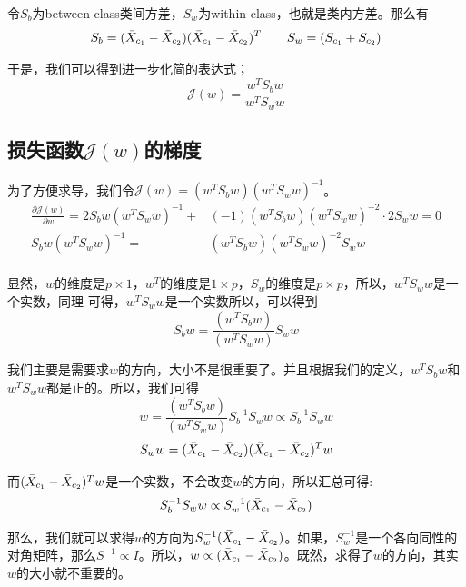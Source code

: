 \documentclass[a4paper]{article}
\begin{document}
令$S_b$为between-class类间方差，$S_w$为within-class，也就是类内方差。那么有
\begin{equation}
    S_b = (\Bar{X}_{c_1} - \Bar{X}_{c_2})(\Bar{X}_{c_1} - \Bar{X}_{c_2})^T \qquad S_w = (S_{c_1}+S_{c_2}) 
\end{equation}

于是，我们可以得到进一步化简的表达式；
\begin{equation}
    \mathcal{J}(w)=\frac{w^TS_bw}{w^TS_ww}
\end{equation}

\subsection{损失函数$\mathcal{J}(w)$的梯度}
为了方便求导，我们令$\mathcal{J}(w)=(w^TS_bw)(w^TS_ww)^{-1}$。
\begin{equation}
    \begin{split}
        \frac{\partial \mathcal{J}(w)}{\partial w} = 2S_bw(w^TS_ww)^{-1} + & (-1)(w^TS_bw)(w^TS_ww)^{-2}\cdot 2S_ww = 0 \\
        S_bw(w^TS_ww)^{-1} = & (w^TS_bw)(w^TS_ww)^{-2}S_ww\\
    \end{split}
\end{equation}

显然，$w$的维度是$p\times 1$，$w^T$的维度是$1 \times p$，$S_w$的维度是$p\times p$，所以，$w^TS_ww$是一个实数，同理 可得，$w^TS_ww$是一个实数所以，可以得到
\begin{equation}
        S_bw =  \frac{(w^TS_bw)}{(w^TS_ww)}S_ww
\end{equation}

我们主要是需要求$w$的方向，大小不是很重要了。并且根据我们的定义，$w^TS_bw$和$w^TS_ww$都是正的。所以，我们可得
\begin{equation}
    w = \frac{(w^TS_bw)}{(w^TS_ww)}S_b^{-1}S_ww \propto S_b^{-1}S_ww
\end{equation}
\begin{equation}
    S_ww =  (\Bar{X}_{c_1} - \Bar{X}_{c_2})(\Bar{X}_{c_1} - \Bar{X}_{c_2})^Tw
\end{equation}

而$(\Bar{X}_{c_1} - \Bar{X}_{c_2})^Tw$是一个实数，不会改变$w$的方向，所以汇总可得:
\begin{equation}
    S_b^{-1}S_ww \propto S_w^{-1}(\Bar{X}_{c_1} - \Bar{X}_{c_2})
\end{equation}

那么，我们就可以求得$w$的方向为$S_w^{-1}(\Bar{X}_{c_1} - \Bar{X}_{c_2})$。如果，$S_w^{-1}$是一个各向同性的对角矩阵，那么$S^{-1}\propto I$。所以，$w\propto (\Bar{X}_{c_1} - \Bar{X}_{c_2})$。既然，求得了$w$的方向，其实$w$的大小就不重要的。
\end{document}
